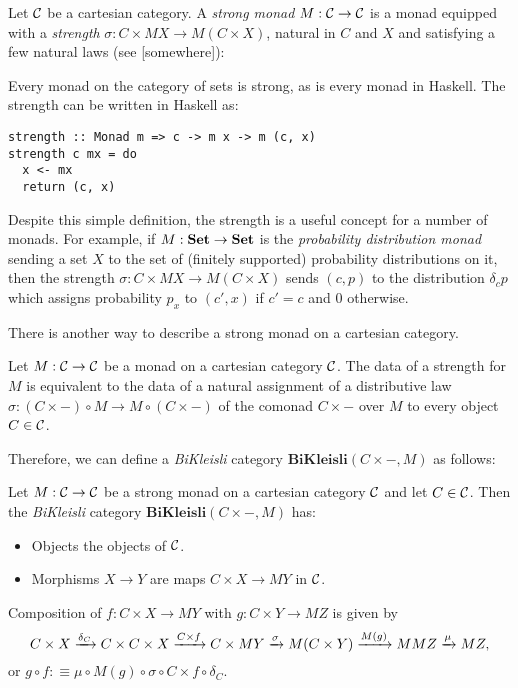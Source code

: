 Let $\operatorname{\mathcal{C}}$ be a cartesian category. A \emph{strong monad} $M : \operatorname{\mathcal{C}} \to \operatorname{\mathcal{C}}$ is a
monad equipped with a \emph{strength} $\sigma : C \times MX \to M(C \times X)$,
natural in $C$ and $X$ and satisfying a few natural laws (see [somewhere]):

  Every monad on the category of sets is strong, as is every monad in Haskell.
  The strength can be written in Haskell as:
\begin{verbatim}
strength :: Monad m => c -> m x -> m (c, x)
strength c mx = do
  x <- mx
  return (c, x)
\end{verbatim}

  Despite this simple definition, the strength is a useful concept for a number
  of monads. For example, if $M : \operatorname{\textbf{Set}} \to \operatorname{\textbf{Set}}$ is the \emph{probability
    distribution monad} sending a set $X$ to the set of (finitely supported)
  probability distributions on it, then the strength $\sigma : C \times MX \to
  M(C \times X)$ sends $(c, p)$ to the distribution $\delta_c p$ which assigns
  probability $p_x$ to $(c', x)$ if $c' = c$ and $0$ otherwise.
  
  There is another way to describe a strong monad on a cartesian category.
\begin{prop}
Let $M : \operatorname{\mathcal{C}} \to \operatorname{\mathcal{C}}$ be a monad on a cartesian category $\operatorname{\mathcal{C}}$. The data of a
strength for $M$ is equivalent to the data of a natural assignment of a
distributive law $\sigma : (C \times -) \circ M \to M \circ (C \times -)$ of the
comonad $C \times -$ over $M$ to every object $C \in \operatorname{\mathcal{C}}$.
\end{prop}

  Therefore, we can define a \emph{BiKleisli} category $\textbf{BiKleisli}(C
  \times -, M)$ as follows:
\begin{defn}
Let $M : \operatorname{\mathcal{C}} \to \operatorname{\mathcal{C}}$ be a strong monad on a cartesian category $\operatorname{\mathcal{C}}$ and let $C
\in \operatorname{\mathcal{C}}$. Then the \emph{BiKleisli} category $\textbf{BiKleisli}(C \times -, M)$
has:
\begin{itemize}
\item Objects the objects of $\operatorname{\mathcal{C}}$.
\item Morphisms $X \to Y$ are maps $C \times X \to MY$ in $\operatorname{\mathcal{C}}$.
\end{itemize}
Composition of $f : C \times X \to MY$ with $g : C \times Y \to MZ$ is given by
$$C \times X \xrightarrow{\delta_C} C \times C \times X \xrightarrow{C \times f} C \times MY
\xrightarrow{\sigma} M(C \times Y) \xrightarrow{M(g)} MMZ \xrightarrow{\mu} MZ,$$
or $g \circ f :\equiv \mu \circ M(g) \circ \sigma \circ C \times f \circ \delta_C$.
\end{defn}

